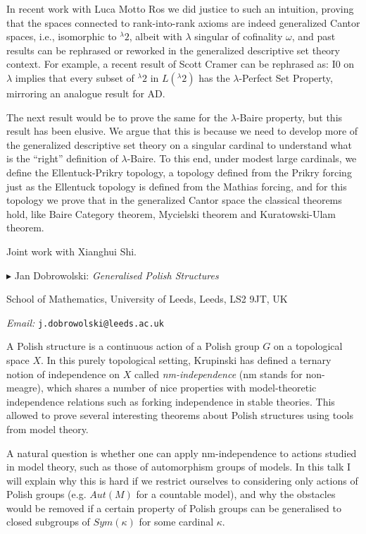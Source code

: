\documentclass[a4paper]{amsart}
\theoremstyle{remark}
\newcommand{\vsp}{\vspace{20pt}}
\begin{document}
In recent work with Luca Motto Ros we did justice to such an intuition, proving that the spaces connected to rank-into-rank axioms are indeed generalized Cantor spaces, i.e., isomorphic to ${}^\lambda 2$, albeit with $\lambda$ singular of cofinality $\omega$, and past results can be rephrased or reworked in the generalized descriptive set theory context. For example, a recent result of Scott Cramer can be rephrased as: I0 on $\lambda$ implies that every subset of ${}^\lambda 2$ in $L({}^\lambda 2)$ has the $\lambda$-Perfect Set Property, mirroring an analogue result for AD.

The next result would be to prove the same for the $\lambda$-Baire property, but this result has been elusive. We argue that this is because we need to develop more of the generalized descriptive set theory on a singular cardinal to understand what is the ``right'' definition of $\lambda$-Baire. To this end, under modest large cardinals, we define the Ellentuck-Prikry topology, a topology defined from the Prikry forcing just as the Ellentuck topology is defined from the Mathias forcing, and for this topology we prove that in the generalized Cantor space the classical theorems hold, like Baire Category theorem, Mycielski theorem and Kuratowski-Ulam theorem.  

Joint work with Xianghui Shi.








\vsp 

\noindent 
$\blacktriangleright$ Jan Dobrowolski: \emph{Generalised Polish Structures} 

\noindent 
School of Mathematics, University of Leeds, Leeds, LS2 9JT, UK 

\noindent 
\emph{Email:} \texttt{j.dobrowolski@leeds.ac.uk} 

A Polish structure is a continuous action of a Polish group $G$ on a topological space $X$.
In this purely topological setting, Krupinski has defined a ternary notion of independence on $X$ called \emph{nm-independence} (nm stands for non-meagre), which shares a number of nice properties with model-theoretic independence relations such as forking independence in stable theories. This allowed to prove several interesting theorems about Polish structures using tools from model theory.

A natural question is whether one can apply nm-independence to actions studied in model theory, such as those of automorphism groups of models. In this talk I will explain why this is hard if we restrict ourselves to considering only actions of Polish groups (e.g. $Aut(M)$ for a countable model), and why the obstacles would be removed if a certain property of Polish groups can be generalised to closed subgroups of $Sym(\kappa)$ for some cardinal $\kappa$.
\end{document}
